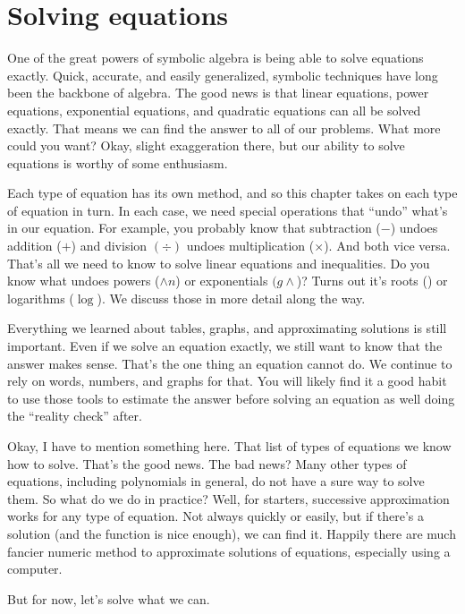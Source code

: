 \chapter{Solving equations}

One of the great powers of symbolic algebra is being able to solve equations exactly.  Quick, accurate, and easily generalized, symbolic techniques have long been the backbone of algebra.  The good news is that linear equations, power equations, exponential equations, and quadratic equations can all be solved exactly. That means we can find the answer to all of our problems.  What more could you want?  Okay, slight exaggeration there, but our ability to solve equations is worthy of some enthusiasm.

Each type of equation has its own method, and so this chapter takes on each type of equation in turn.  In each case, we need special operations that ``undo'' what's in our equation.  For example, you probably know that subtraction ($-$) undoes addition ($+$) and division $(\div)$ undoes multiplication ($\times$).  And both vice versa.  That's all we need to know to solve linear equations and inequalities.  Do you know what undoes powers ($\wedge n$) or exponentials $(g\wedge$)?  Turns out it's roots (\raisebox{.2em}{$\sqrt[n]{~\text{  }}$}) or logarithms ($\log$).  We discuss those in more detail along the way.   

Everything we learned about tables, graphs, and approximating solutions is still important.  Even if we solve an equation exactly, we still want to know that the answer makes sense.  That's the one thing an equation cannot do.  We continue to rely on words, numbers, and graphs for that.  You will likely find it a good habit to use those tools to estimate the answer before solving an equation as well doing the ``reality check'' after.  

Okay, I have to mention something here.  That list of types of equations we know how to solve.  That's the good news.  The bad news?  Many other types of equations, including polynomials in general, do not have a sure way to solve them.  So what do we do in practice?  Well, for starters, successive approximation works for any type of equation.  Not always quickly or easily, but if there's a solution (and the function is nice enough), we can find it.  Happily there are much fancier numeric method to approximate solutions of equations, especially using a computer.   

But for now, let's solve what we can.
